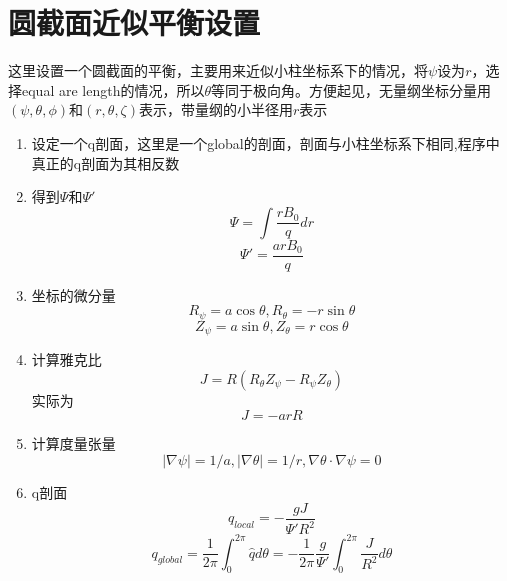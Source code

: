 \documentclass[11pt,a4paper]{article}
\begin{document}
%

\section{圆截面近似平衡设置}

这里设置一个圆截面的平衡，主要用来近似小柱坐标系下的情况，将$\psi$设为$r$，选择equal are length的情况，所以$\theta$等同于极向角。方便起见，无量纲坐标分量用$(\psi,\theta,\phi)$和$(r,\theta,\zeta)$表示，带量纲的小半径用$r$表示

\begin{enumerate}
 	\item 设定一个q剖面，这里是一个global的剖面，剖面与小柱坐标系下相同,程序中真正的q剖面为其相反数
 	\item 得到$\Psi$和$\Psi'$
 		$$\Psi = \int \frac{rB_0}{q} dr $$ 
 		$$\Psi' = \frac{arB_0}{q}  $$
	\item 坐标的微分量 
		$$ R_\psi = a\cos\theta, R_\theta = -r\sin\theta $$
		$$ Z_\psi = a\sin\theta, Z_\theta =  r\cos\theta $$
	\item 计算雅克比
		$$ J = R(R_\theta Z_\psi - R_\psi Z_\theta) $$
		实际为
		$$ J = -arR $$
	\item 计算度量张量
		$$ |\nabla\psi| = 1/a, |\nabla\theta| = 1/r, \nabla\theta\cdot\nabla\psi = 0 $$ 
	\item q剖面
		$$ q_{local} = -\frac{gJ}{\Psi'R^2} $$
		$$ 
		q_{global} = \frac{1}{2\pi}\int_{0}^{2\pi}\hat{q}d\theta
		=-\frac{1}{2\pi}\frac{g}{\Psi'}\int_{0}^{2\pi}\frac{J}{R^2}d\theta
		$$
\end{enumerate}
\end{document}
